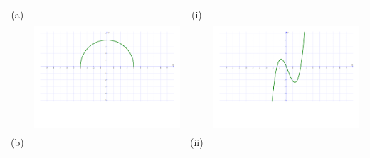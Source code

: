 \documentclass[12pt]{article}
\begin{document}
\begin{enumerate}
\begin{center}
\begin{tabular}{cc|cc}
(a) && (i)&\\
&\includegraphics[scale=0.22]{match1.pdf}& & \includegraphics[scale=0.22]{matchd.pdf}\\
(b) && (ii)&\\

\end{tabular}
\end{center}
\end{enumerate}
\end{document}
